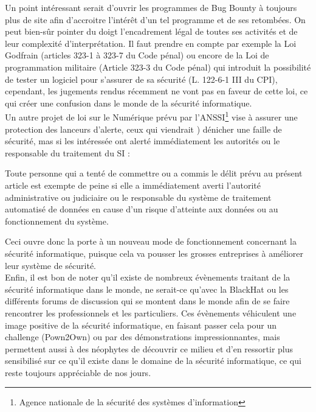 \documentclass[a4paper]{memoir}
\begin{document}
Un point intéressant serait d'ouvrir les programmes de Bug Bounty à toujours plus de site afin d'accroitre l'intérêt d'un tel programme et de ses retombées.
On peut bien-sûr pointer du doigt l'encadrement légal de toutes ses activités et de leur complexité d'interprétation. Il faut prendre en compte par exemple la Loi Godfrain (articles 323-1 à 323-7 du Code pénal) ou encore de la Loi de programmation militaire (Article 323-3 du Code pénal) qui introduit la possibilité de tester un logiciel pour s'assurer de sa sécurité (L. 122-6-1 III du CPI), cependant, les jugements rendus récemment ne vont pas en faveur de cette loi, ce qui créer une confusion dans le monde de la sécurité informatique. \\
\noindent Un autre projet de loi sur le Numérique prévu par l'ANSSI\footnote{Agence nationale de la sécurité des systèmes d'information} vise à assurer une protection des lanceurs d'alerte, ceux qui viendrait ) dénicher une faille de sécurité, mas si les intéressée ont alerté immédiatement les autorités ou le responsable du traitement du SI\cite{anssi} : 

\begin{displayquote}
Toute personne qui a tenté de commettre ou a commis le délit prévu au présent article est exempte de peine si elle a immédiatement averti l'autorité administrative ou judiciaire ou le responsable du système de traitement automatisé de données en cause d'un risque d'atteinte aux données ou au fonctionnement du système.\\
\end{displayquote}

Ceci ouvre donc la porte à un nouveau mode de fonctionnement concernant la sécurité informatique, puisque cela va pousser les grosses entreprises à améliorer leur système de sécurité.\\
 

Enfin, il est bon de noter qu'il existe de nombreux évènements traitant de la sécurité informatique dans le monde, ne serait-ce qu'avec la BlackHat ou les différents forums de discussion qui se montent dans le monde afin de se faire rencontrer les professionnels et les particuliers. Ces évènements véhiculent une image positive de la sécurité informatique, en faisant passer cela pour un challenge (Pown2Own) ou par des démonstrations impressionnantes, mais permettent aussi à des néophytes de découvrir ce milieu et d'en ressortir plus sensibilisé sur ce qu'il existe dans le domaine de la sécurité informatique, ce qui reste toujours appréciable de nos jours.\\
\end{document}
